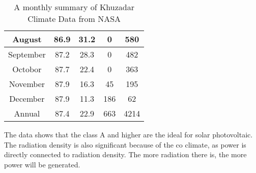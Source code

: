 \documentclass[conference]{IEEEtran}
\begin{document}
\begin{table}[!]
\begin{tabular}{|ccccc|}
\multicolumn{1}{|c|}{August}    & \multicolumn{1}{c|}{86.9}                                                           & \multicolumn{1}{c|}{31.2}                                                         & \multicolumn{1}{c|}{0}                                                        & 580                                                              \\ \hline
\multicolumn{1}{|c|}{September} & \multicolumn{1}{c|}{87.2}                                                           & \multicolumn{1}{c|}{28.3}                                                         & \multicolumn{1}{c|}{0}                                                        & 482                                                              \\ \hline
\multicolumn{1}{|c|}{Octobor}   & \multicolumn{1}{c|}{87.7}                                                           & \multicolumn{1}{c|}{22.4}                                                         & \multicolumn{1}{c|}{0}                                                        & 363                                                              \\ \hline
\multicolumn{1}{|c|}{November}  & \multicolumn{1}{c|}{87.9}                                                           & \multicolumn{1}{c|}{16.3}                                                         & \multicolumn{1}{c|}{45}                                                       & 195                                                              \\ \hline
\multicolumn{1}{|c|}{December}  & \multicolumn{1}{c|}{87.9}                                                           & \multicolumn{1}{c|}{11.3}                                                         & \multicolumn{1}{c|}{186}                                                      & 62                                                               \\ \hline
\multicolumn{1}{|c|}{Annual}    & \multicolumn{1}{c|}{87.4}                                                           & \multicolumn{1}{c|}{22.9}                                                         & \multicolumn{1}{c|}{663}                                                      & 4214                                                             \\ \hline
\end{tabular}
\caption{A monthly summary of Khuzadar Climate Data from NASA}
\label{tab11}
\end{table}
The data shows that the class A and higher are the ideal for solar photovoltaic. The radiation density is also significant because of the co climate, as power is directly connected to radiation density.
The more radiation there is, the more power will be generated.
\end{document}
